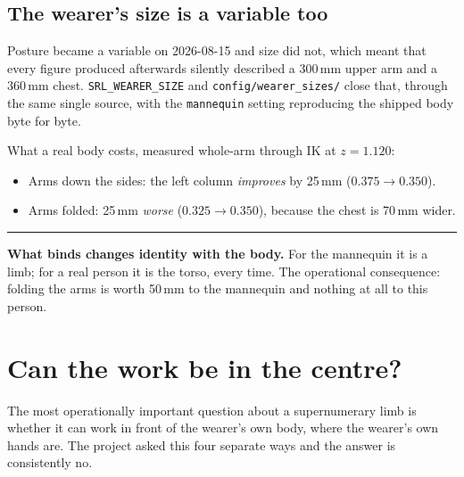 \documentclass[11pt,a4paper,oneside]{report}
\newcommand{\code}[1]{\texttt{\small #1}}
\newcommand{\file}[1]{\texttt{\small #1}}
\newcommand{\keyfact}[1]{%
  \par\vspace{7pt}\noindent
  \hspace*{0pt}\textcolor{srlblue}{\rule{2.5pt}{\dimexpr\baselineskip\relax}}%
  \hspace{9pt}%
  \begin{minipage}[t]{\dimexpr\textwidth-14pt\relax}
  \small #1
  \end{minipage}\par\vspace{7pt}}
\begin{document}
\subsection{The wearer's size is a variable too}

Posture became a variable on 2026-08-15 and size did not, which meant that
every figure produced afterwards silently described a 300\,mm upper arm and a
360\,mm chest. \code{SRL\_WEARER\_SIZE} and \file{config/wearer\_sizes/} close
that, through the same single source, with the \code{mannequin} setting
reproducing the shipped body byte for byte.

What a real body costs, measured whole-arm through IK at $z=1.120$:

\begin{itemize}
\item Arms down the sides: the left column \emph{improves} by 25\,mm
      ($0.375 \rightarrow 0.350$).
\item Arms folded: 25\,mm \emph{worse} ($0.325 \rightarrow 0.350$), because the
      chest is 70\,mm wider.
\end{itemize}

\keyfact{\textbf{What binds changes identity with the body.} For the mannequin
it is a limb; for a real person it is the torso, every time. The operational
consequence: folding the arms is worth 50\,mm to the mannequin and nothing at
all to this person.}

\section{Can the work be in the centre?}

The most operationally important question about a supernumerary limb is
whether it can work in front of the wearer's own body, where the wearer's own
hands are. The project asked this four separate ways and the answer is
consistently no.
\end{document}
